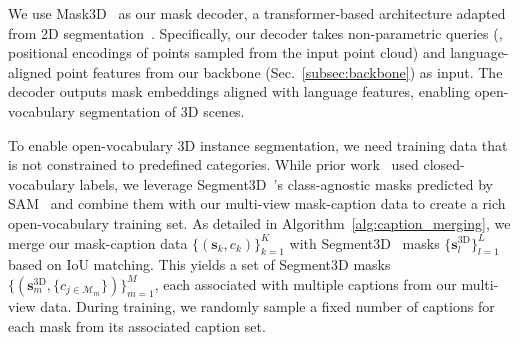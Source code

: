 We use Mask3D~\cite{schult2023mask3d} as our mask decoder, a transformer-based architecture adapted from 2D segmentation~\cite{cheng2021per,cheng2022masked}.
Specifically, our decoder takes non-parametric queries (\ie, positional encodings of points sampled from the input point cloud) and language-aligned point features from our backbone (Sec.~\ref{subsec:backbone}) as input.
The decoder outputs mask embeddings aligned with language features, enabling open-vocabulary segmentation of 3D scenes.

To enable open-vocabulary 3D instance segmentation, we need training data that is not constrained to predefined categories.
While prior work~\cite{takmaz2023openmask3d,nguyen2024open3dis,huang2024openins3d} used closed-vocabulary labels, we leverage Segment3D~\cite{huang2024segment3d}'s class-agnostic masks predicted by SAM~\cite{sam} and combine them with our multi-view mask-caption data to create a rich open-vocabulary training set.
As detailed in Algorithm~\ref{alg:caption_merging}, we merge our mask-caption data $\{(\mathbf{s}_k, c_k)\}_{k=1}^K$ with Segment3D~\cite{huang2024segment3d} masks $\{\mathbf{s}_{l}^{\mathrm{3D}}\}_{l=1}^L$ based on IoU matching.
This yields a set of Segment3D masks $\{(\mathbf{s}^{\mathrm{3D}}_m, \{c_{j\in \mathcal{M}_m}\})\}_{m=1}^M$, each associated with multiple captions from our multi-view data.
During training, we randomly sample a fixed number of captions for each mask from its associated caption set.


